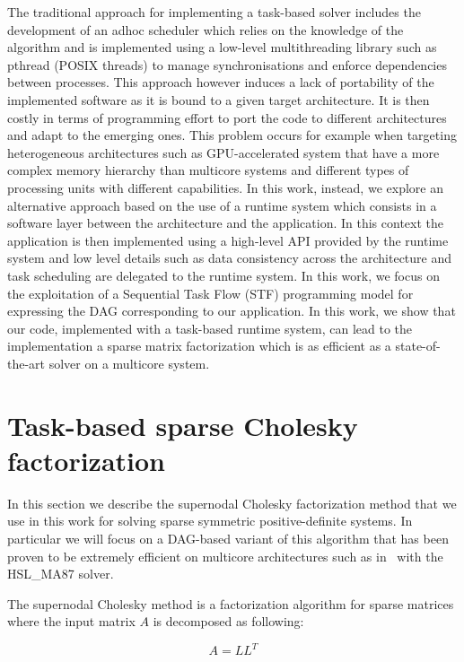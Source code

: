\documentclass{article}
\newcommand{\ma}{HSL\_MA87\xspace}
\begin{document}
The traditional approach for implementing a task-based solver includes
the development of an adhoc scheduler which relies on the knowledge of
the algorithm and is implemented using a low-level multithreading
library such as pthread (POSIX threads) to manage synchronisations and
enforce dependencies between processes. This approach however induces
a lack of portability of the implemented software as it is bound to a
given target architecture. It is then costly in terms of programming
effort to port the code to different architectures and adapt to the
emerging ones. This problem occurs for example when targeting
heterogeneous architectures such as GPU-accelerated system that have a
more complex memory hierarchy than multicore systems and different
types of processing units with different capabilities. In this work,
instead, we explore an alternative approach based on the use of a
runtime system which consists in a software layer between the
architecture and the application. In this context the application is
then implemented using a high-level API provided by the runtime system
and low level details such as data consistency across the architecture
and task scheduling are delegated to the runtime system. In this work,
we focus on the exploitation of a Sequential Task Flow (STF)
programming model for expressing the DAG corresponding to our
application. In this work, we show that our code, implemented with a
task-based runtime system, can lead to the implementation a sparse
matrix factorization which is as efficient as a state-of-the-art
solver on a multicore system.

\section{Task-based sparse Cholesky factorization}\label{sec:chol}
\setcounter{equation}{0}
\setcounter{table}{0}
\setcounter{figure}{0}

In this section we describe the supernodal Cholesky factorization
method that we use in this work for solving sparse symmetric
positive-definite systems. In particular we will focus on a DAG-based
variant of this algorithm that has been proven to be extremely
efficient on multicore architectures such as in~\cite{h.r.s:10} with
the \ma solver.

The supernodal Cholesky method is a factorization algorithm for sparse
matrices where the input matrix $A$ is decomposed as following:

\begin{equation}\label{eq:ch}
  A = LL^{T}
\end{equation}
\end{document}
